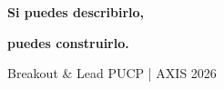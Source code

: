 \documentclass[aspectratio=169]{beamer}
\begin{document}
\begin{frame}[plain]
\begin{center}
\vspace{2.5cm}
{\fontsize{40}{44}\selectfont\bfseries\color{accent} Si puedes describirlo,}

\vspace{0.5cm}
{\fontsize{40}{44}\selectfont\bfseries\color{textwhite} puedes construirlo.}

\vspace{2cm}
{\color{textgray}\large Breakout \& Lead PUCP | AXIS 2026}
\end{center}
\end{frame}
\end{document}
